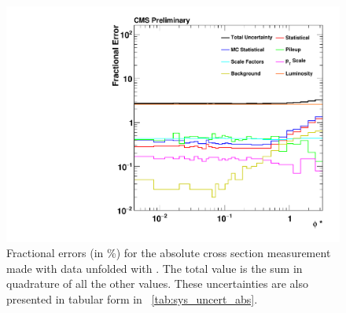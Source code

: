 \begin{figure}[!p]
    \centering
    \includegraphics[width=\textwidth]{figures/data_uncertainty_absolute.pdf}
    \caption[
        Fractional errors (in \%) for the absolute cross section measurement
        made with data unfolded with \MADGRAPH.
    ]{
        Fractional errors (in \%) for the absolute cross section measurement
        made with data unfolded with \MADGRAPH. The total value is the sum in
        quadrature of all the other values. These uncertainties are also
        presented in tabular form in \TAB~\ref{tab:sys_uncert_abs}.
    }
    \label{fig:sys_uncert_abs}
\end{figure}
